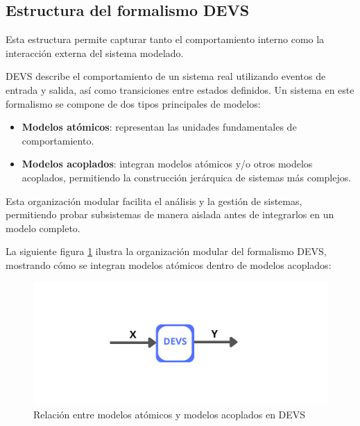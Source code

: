 \documentclass[12pt,oneside]{templates/unerthesis}
\providecommand{\tightlist}{%
  \setlength{\itemsep}{0pt}\setlength{\parskip}{0pt}}
\begin{document}
\hypertarget{estructura-del-formalismo-devs}{%
\subsection{Estructura del formalismo DEVS}\label{estructura-del-formalismo-devs}}

Esta estructura permite capturar tanto el comportamiento interno como la interacción externa del sistema modelado.

DEVS describe el comportamiento de un sistema real utilizando eventos de entrada y salida, así como transiciones entre estados definidos. Un sistema en este formalismo se compone de dos tipos principales de modelos:

\begin{itemize}
\tightlist
\item
  \textbf{Modelos atómicos}: representan las unidades fundamentales de comportamiento.
\item
  \textbf{Modelos acoplados}: integran modelos atómicos y/o otros modelos acoplados, permitiendo la construcción jerárquica de sistemas más complejos.
\end{itemize}

Esta organización modular facilita el análisis y la gestión de sistemas, permitiendo probar subsistemas de manera aislada antes de integrarlos en un modelo completo.

La siguiente figura \ref{fig:devs} ilustra la organización modular del formalismo DEVS, mostrando cómo se integran modelos atómicos dentro de modelos acoplados:

\begin{figure}

{\centering \includegraphics[width=1\linewidth]{images/devs} 

}

\caption{Relación entre modelos atómicos y modelos acoplados en DEVS}\label{fig:devs}
\end{figure}
\end{document}

